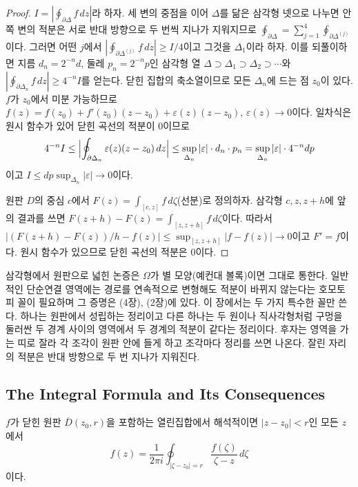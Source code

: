 \begin{proof}
$I=|\oint_{\partial\Delta}f\,dz|$라 하자. 세 변의 중점을 이어 $\Delta$를 닮은 삼각형 넷으로 나누면 안쪽 변의 적분은 서로 반대 방향으로 두 번씩 지나가 지워지므로 $\oint_{\partial\Delta}=\sum_{j=1}^4\oint_{\partial\Delta^{(j)}}$이다. 그러면 어떤 $j$에서 $|\oint_{\partial\Delta^{(j)}}f\,dz|\ge I/4$이고 그것을 $\Delta_1$이라 하자. 이를 되풀이하면 지름 $d_n=2^{-n}d$, 둘레 $p_n=2^{-n}p$인 삼각형 열 $\Delta\supset\Delta_1\supset\Delta_2\supset\cdots$와 $|\oint_{\partial\Delta_n}f\,dz|\ge4^{-n}I$를 얻는다. 닫힌 집합의 축소열이므로 모든 $\Delta_n$에 드는 점 $z_0$이 있다. $f$가 $z_0$에서 미분 가능하므로 $f(z)=f(z_0)+f'(z_0)(z-z_0)+\varepsilon(z)(z-z_0)$, $\varepsilon(z)\to0$이다. 일차식은 원시 함수가 있어 닫힌 곡선의 적분이 $0$이므로
\[
4^{-n}I\le\Bigl|\oint_{\partial\Delta_n}\varepsilon(z)(z-z_0)\,dz\Bigr|\le\sup_{\Delta_n}|\varepsilon|\cdot d_n\cdot p_n=\sup_{\Delta_n}|\varepsilon|\cdot4^{-n}dp
\]
이고 $I\le dp\sup_{\Delta_n}|\varepsilon|\to0$이다.

원판 $D$의 중심 $c$에서 $F(z)=\int_{[c,z]}f\,d\zeta$(선분)로 정의하자. 삼각형 $c,z,z+h$에 앞의 결과를 쓰면 $F(z+h)-F(z)=\int_{[z,z+h]}f\,d\zeta$이다. 따라서 $|(F(z+h)-F(z))/h-f(z)|\le\sup_{[z,z+h]}|f-f(z)|\to0$이고 $F'=f$이다. 원시 함수가 있으므로 닫힌 곡선의 적분은 $0$이다.
\end{proof}

삼각형에서 원판으로 넓힌 논증은 $\Omega$가 별 모양(예컨대 볼록)이면 그대로 통한다. 일반적인 단순연결 영역에는 경로를 연속적으로 변형해도 적분이 바뀌지 않는다는 호모토피 꼴이 필요하며 그 증명은 \cite{ahlfors1979complex}(4장), \cite{stein2003complex}(2장)에 있다. 이 장에서는 두 가지 특수한 꼴만 쓴다. 하나는 원판에서 성립하는 정리이고 다른 하나는 두 원이나 직사각형처럼 구멍을 둘러싼 두 경계 사이의 영역에서 두 경계의 적분이 같다는 정리이다. 후자는 영역을 가는 띠로 잘라 각 조각이 원판 안에 들게 하고 조각마다 정리를 쓰면 나온다. 잘린 자리의 적분은 반대 방향으로 두 번 지나가 지워진다.

\subsection{The Integral Formula and Its Consequences}

\begin{theorem}[Cauchy 적분 공식]
\label{thm:cauchy-formula}
$f$가 닫힌 원판 $\overline D(z_0,r)$을 포함하는 열린집합에서 해석적이면 $|z-z_0|<r$인 모든 $z$에서
\[
f(z)=\frac{1}{2\pi i}\oint_{|\zeta-z_0|=r}\frac{f(\zeta)}{\zeta-z}\,d\zeta
\]
이다.
\end{theorem}

